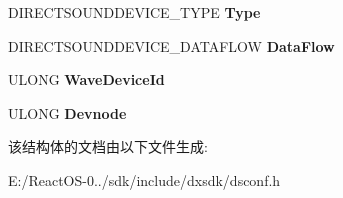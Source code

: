 \begin{DoxyCompactItemize}
D\+I\+R\+E\+C\+T\+S\+O\+U\+N\+D\+D\+E\+V\+I\+C\+E\+\_\+\+T\+Y\+PE {\bfseries Type}
\item 
\mbox{\label{struct___d_s_p_r_o_p_e_r_t_y___d_i_r_e_c_t_s_o_u_n_d_d_e_v_i_c_e___d_e_s_c_r_i_p_t_i_o_n__1___d_a_t_a_abb5a37f961137999eae81819101bc287}} 
D\+I\+R\+E\+C\+T\+S\+O\+U\+N\+D\+D\+E\+V\+I\+C\+E\+\_\+\+D\+A\+T\+A\+F\+L\+OW {\bfseries Data\+Flow}
\item 
\mbox{\label{struct___d_s_p_r_o_p_e_r_t_y___d_i_r_e_c_t_s_o_u_n_d_d_e_v_i_c_e___d_e_s_c_r_i_p_t_i_o_n__1___d_a_t_a_a643c3b4f66d18c4323e6030d92870824}} 
U\+L\+O\+NG {\bfseries Wave\+Device\+Id}
\item 
\mbox{\label{struct___d_s_p_r_o_p_e_r_t_y___d_i_r_e_c_t_s_o_u_n_d_d_e_v_i_c_e___d_e_s_c_r_i_p_t_i_o_n__1___d_a_t_a_ae55379c0e6efdfe082b9262fcaf04cec}} 
U\+L\+O\+NG {\bfseries Devnode}
\end{DoxyCompactItemize}


该结构体的文档由以下文件生成\+:\begin{DoxyCompactItemize}
\item 
E\+:/\+React\+O\+S-\/0../sdk/include/dxsdk/dsconf.\+h\end{DoxyCompactItemize}
